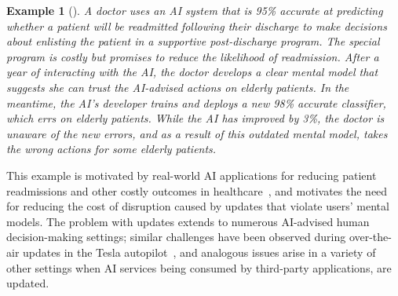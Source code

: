 \documentclass[letterpaper]{article} %
\newcommand{\bug}
    {\mbox{\rule{2mm}{2mm}}}
\newcommand{\Bug}[1]
    {\bug \footnote{BUG: {#1}}}
\newcommand{\?}{\mbox{?}}
\newtheorem*{example}{Example}
\begin{document}

\begin{example}[]
A doctor uses an AI system that is 95\% accurate at predicting whether a patient will be readmitted following their discharge to make decisions about enlisting the patient in a supportive post-discharge program. The special program is costly but promises to reduce the likelihood of readmission. After a year of interacting with the AI, the doctor develops a clear mental model that suggests she can trust the AI-advised actions on elderly patients. In the meantime, the AI's developer trains and deploys a new 98\% accurate classifier, which errs on elderly patients. 
While the AI has improved by 3\%, the doctor is unaware of the new errors, and as a result of this outdated mental model, takes the wrong actions for some elderly patients.
\end{example}

This example is motivated by real-world AI applications for reducing patient readmissions and other costly outcomes in healthcare~\cite{bayati2014data,wiens2016patient,caruana2015intelligible}, and motivates the need for reducing the cost of disruption caused by updates that violate  %
users' mental models. The problem with updates extends to numerous AI-advised human decision-making settings; similar challenges have been observed during over-the-air updates in the Tesla autopilot~\cite{tesla:2018}, and  analogous issues arise in a variety of other settings when AI services 
being consumed by third-party applications, are updated.
\end{document}
